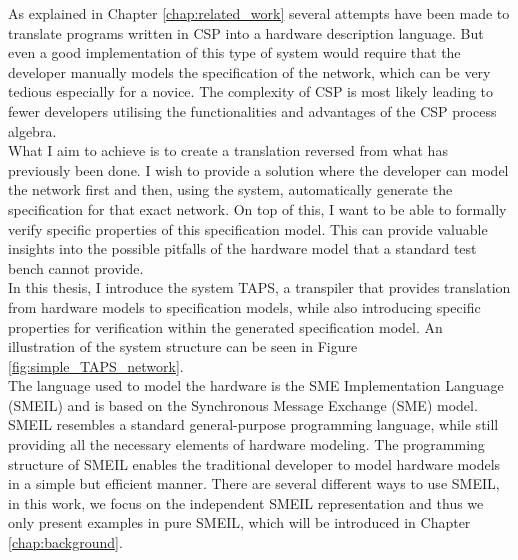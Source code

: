 As explained in Chapter \ref{chap:related_work} several attempts have been made to translate programs written in CSP into a hardware description language. But even a good implementation of this type of system would require that the developer manually models the specification of the \cspm{} network, which can be very tedious especially for a novice.
The complexity of CSP is most likely leading to fewer developers utilising the functionalities and advantages of the CSP process algebra.\\

What I aim to achieve is to create a translation reversed from what has previously been done. I wish to provide a solution where the developer can model the network first and then, using the system, automatically generate the specification for that exact network. On top of this, I want to be able to formally verify specific properties of this specification model. This can provide valuable insights into the possible pitfalls of the hardware model that a standard test bench cannot provide.\\

In this thesis, I introduce the system TAPS, a transpiler that provides translation from hardware models to specification models, while also introducing specific properties for verification within the generated specification model. An illustration of the system structure can be seen in Figure \ref{fig:simple_TAPS_network}.\\

The language used to model the hardware is the SME Implementation Language (SMEIL) and is based on the Synchronous Message Exchange (SME) model. SMEIL resembles a standard general-purpose programming language, while still providing all the necessary elements of hardware modeling. The programming structure of SMEIL enables the traditional developer to model hardware models in a simple but efficient manner. There are several different ways to use SMEIL, in this work, we focus on the independent SMEIL representation and thus we only present examples in pure SMEIL, which will be introduced in Chapter \ref{chap:background}.\\


